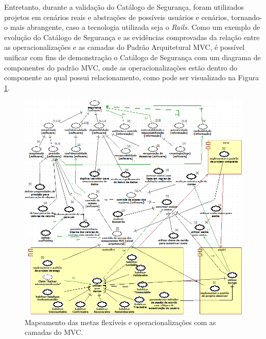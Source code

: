 \pagebreak

Entretanto, durante a validação do Catálogo de Segurança, foram utilizados projetos em cenários reais e abstrações de possíveis usuários e cenários, tornando-o mais abrangente, caso a tecnologia utilizada seja o \textit{Rails}. Como um exemplo de evolução do Catálogo de Segurança e as evidências comprovadas da relação entre as operacionalizações e as camadas do Padrão Arquitetural MVC, é possível unificar com fins de demonstração o Catálogo de Segurança com um diagrama de componentes do padrão MVC, onde as operacionalizações estão dentro do componente ao qual possui relacionamento, como pode ser visualizado na Figura \ref{catalogoMapeado}. 

\begin{figure}[h!]
	\centering
	\includegraphics[keepaspectratio=true,scale=0.7]{figuras/catalogoMapeado.PNG}
	\caption{Mapeamento das metas flexíveis e operacionalizações com as camadas do MVC.}
	\label{catalogoMapeado}
\end{figure}

